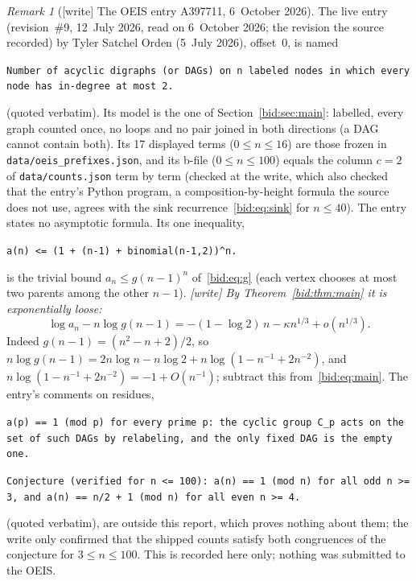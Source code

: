 \documentclass[11pt,letterpaper]{article}
\numberwithin{equation}{section}
\theoremstyle{remark}\newtheorem{remark}[theorem]{Remark}
\newcommand{\file}[1]{\nolinkurl{#1}}
\begin{document}
\begin{remark}[{[write]} The OEIS entry A397711, 6~October 2026]\label{bid:rem:oeis}
The live entry (revision~\#9, 12~July 2026, read on 6~October 2026; the
revision the source recorded) by Tyler Satchel Orden (5~July 2026), offset~$0$,
is named
\begin{center}\small
\parbox{0.92\textwidth}{\raggedright\texttt{Number of acyclic digraphs (or DAGs) on n labeled nodes in which every node has in-degree at most 2.}}
\end{center}
(quoted verbatim). Its model is the one of Section~\ref{bid:sec:main}:
labelled, every graph counted once, no loops and no pair joined in both
directions (a DAG cannot contain both). Its 17 displayed terms
($0\le n\le16$) are those frozen in \file{data/oeis_prefixes.json}, and its
b-file ($0\le n\le100$) equals the column $c=2$ of \file{data/counts.json}
term by term (checked at the write, which also checked that the entry's
Python program, a composition-by-height formula the source does not use,
agrees with the sink recurrence~\eqref{bid:eq:sink} for $n\le40$). The entry
states no asymptotic formula. Its one inequality,
\begin{center}\small
\parbox{0.92\textwidth}{\raggedright\texttt{a(n) <= (1 + (n-1) + binomial(n-1,2))\textasciicircum n.}}
\end{center}
is the trivial bound $a_n\le g(n-1)^n$ of~\eqref{bid:eq:g} (each vertex
chooses at most two parents among the other $n-1$). \emph{[write] By
Theorem~\ref{bid:thm:main} it is exponentially loose:}
\[
 \log a_n-n\log g(n-1)=-(1-\log2)\,n-\kappa n^{1/3}+o(n^{1/3}).
\]
Indeed $g(n-1)=(n^2-n+2)/2$, so
$n\log g(n-1)=2n\log n-n\log2+n\log(1-n^{-1}+2n^{-2})$, and
$n\log(1-n^{-1}+2n^{-2})=-1+O(n^{-1})$; subtract this from~\eqref{bid:eq:main}.
The entry's comments on residues,
\begin{center}\small
\parbox{0.92\textwidth}{\raggedright\texttt{a(p) == 1 (mod p) for every prime p: the cyclic group C\_p acts on the set of such DAGs by relabeling, and the only fixed DAG is the empty one.}\par\smallskip
\texttt{Conjecture (verified for n <= 100): a(n) == 1 (mod n) for all odd n >= 3, and a(n) == n/2 + 1 (mod n) for all even n >= 4.}}
\end{center}
(quoted verbatim), are outside this report, which proves nothing about them;
the write only confirmed that the shipped counts satisfy both congruences of
the conjecture for $3\le n\le100$. This is recorded here only; nothing was
submitted to the OEIS.
\end{remark}
\end{document}
